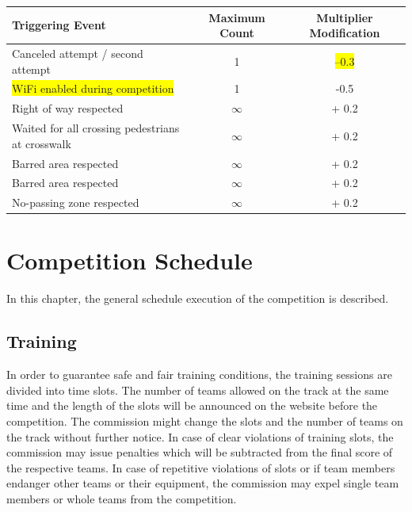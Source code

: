 \documentclass[a4paper]{report}
\begin{document}
\begin{mdframed}[linecolor=red,linewidth=2pt]
	\begin{table}[H]
		\begin{tabular}{@{}lcc@{}}
			\toprule
			\textbf{Triggering Event}                          & \textbf{Maximum Count} & \textbf{Multiplier Modification} \\ \midrule
			Canceled attempt / second attempt                  & 1                      & \colorbox{yellow}{–0.3}          \\
			\colorbox{yellow}{WiFi enabled during competition} & 1                      & -0.5                             \\
			Right of way respected                             & $\infty$               & + 0.2                            \\
			Waited for all crossing pedestrians at crosswalk   & $\infty$               & + 0.2                            \\
			Barred area respected                              & $\infty$               & + 0.2                            \\
			Barred area respected                              & $\infty$               & + 0.2                            \\
			No-passing zone respected                          & $\infty$               & + 0.2                            \\
			\bottomrule
		\end{tabular}
	\end{table}

\end{mdframed}

\chapter{Competition Schedule}

In this chapter, the general schedule execution of the competition is
described.

\section{Training}

In order to guarantee safe and fair training conditions, the training sessions
are divided into time slots. The number of teams allowed on the track at the
same time and the length of the slots will be announced on the website before
the competition. The commission might change the slots and the number of teams
on the track without further notice. In case of clear violations of training
slots, the commission may issue penalties which will be subtracted from the
final score of the respective teams. In case of repetitive violations of slots
or if team members endanger other teams or their equipment, the commission may
expel single team members or whole teams from the competition.
\end{document}
